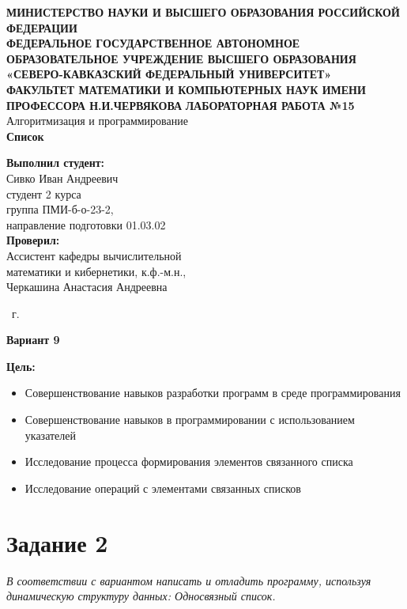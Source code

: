 \documentclass[14pt,a4paper]{article}
\begin{document}
\begin{titlepage}
\begin{center}
{\large\scshape\bfseries
МИНИСТЕРСТВО НАУКИ И ВЫСШЕГО ОБРАЗОВАНИЯ РОССИЙСКОЙ ФЕДЕРАЦИИ\\
ФЕДЕРАЛЬНОЕ ГОСУДАРСТВЕННОЕ АВТОНОМНОЕ ОБРАЗОВАТЕЛЬНОЕ УЧРЕЖДЕНИЕ ВЫСШЕГО ОБРАЗОВАНИЯ\\
«СЕВЕРО-КАВКАЗСКИЙ ФЕДЕРАЛЬНЫЙ УНИВЕРСИТЕТ»\\
ФАКУЛЬТЕТ МАТЕМАТИКИ И КОМПЬЮТЕРНЫХ НАУК ИМЕНИ ПРОФЕССОРА Н.И.ЧЕРВЯКОВА}
\vfill
\Large{\textbf{ЛАБОРАТОРНАЯ РАБОТА №15}}\\[2mm]
\large{Алгоритмизация и программирование}\\[6mm]
\large{\textbf{Список}}\\[20mm]
\end{center}
\begin{flushright}
\large{
\textbf{Выполнил студент:}\\
Сивко Иван Андреевич\\
студент 2 курса\\
группа ПМИ-б-о-23-2,\\
направление подготовки 01.03.02\\[5mm]
\textbf{Проверил:}\\
Ассистент кафедры вычислительной\\
математики и кибернетики, к.ф.-м.н.,\\
Черкашина Анастасия Андреевна}
\end{flushright}
\vfill
\centerline{ \the\year\ г. }
\end{titlepage}


\centerline{\large\textbf{Вариант 9}}
\large{\textbf{Цель:}}
\begin{small}
\begin{itemize}
\item{Совершенствование навыков разработки программ в среде программирования}
\item{Совершенствование навыков в программировании с использованием указателей}
\item{Исследование процесса формирования элементов связанного списка}
\item{Исследование операций с элементами связанных списков}
\end{itemize}
\end{small}

\section*{Задание 2}
\textit{В соответствии с вариантом написать и отладить программу, используя
динамическую структуру данных: Односвязный список.}
\renewcommand{\thesubsection}{\arabic{subsection}} %
\setcounter{subsection}{0} %
\end{document}

